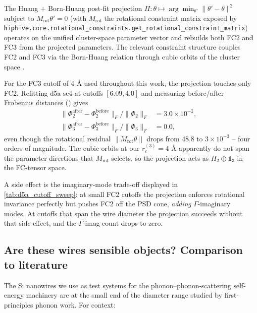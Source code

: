 The Huang + Born-Huang post-fit projection
$\Pi: \theta \mapsto \arg\min_{\theta'} \|\theta'-\theta\|^2$ subject
to $M_\mathrm{rot}\theta' = 0$ (with $M_\mathrm{rot}$ the rotational
constraint matrix exposed by
\texttt{hiphive.core.rotational\_constraints.\allowbreak get\_rotational\_constraint\_matrix})
operates on the unified cluster-space parameter vector and rebuilds
both FC2 and FC3 from the projected parameters.  The relevant
constraint structure couples FC2 and FC3 via the Born-Huang relation
through cubic orbits of the cluster space \cite{eriksson_hiphive_2019}.

For the FC3 cutoff of 4 Å used throughout this work, the projection
touches only FC2.  Refitting d5a sc4 at cutoffs $[6.09, 4.0]$ and
measuring before/after Frobenius distances
() gives
\begin{align*}
  \|\Phi_2^\mathrm{after} - \Phi_2^\mathrm{before}\|_F / \|\Phi_2\|_F &= 3.0 \times 10^{-2}, \\
  \|\Phi_3^\mathrm{after} - \Phi_3^\mathrm{before}\|_F / \|\Phi_3\|_F &= 0.0,
\end{align*}
even though the rotational residual $\|M_\mathrm{rot}\theta\|$ drops
from 48.8 to $3 \times 10^{-3}$ -- four orders of magnitude.  The
cubic orbits at our $r_c^{(3)} = 4$ Å apparently do not span the
parameter directions that $M_\mathrm{rot}$ selects, so the projection
acts as $\Pi_2 \oplus \mathbb{1}_3$ in the FC-tensor space.

A side effect is the imaginary-mode trade-off displayed in
\cref{tab:d5a_cutoff_sweep}: at small FC2 cutoffs the projection
enforces rotational invariance perfectly but pushes FC2 off the PSD
cone, \emph{adding} $\Gamma$-imaginary modes.  At cutoffs that span the wire
diameter the projection succeeds without that side-effect, and the
$\Gamma$-imag count drops to zero.

\subsection{Are these wires sensible objects?  Comparison to literature}
\label{sec:sinw_literature}

The Si nanowires we use as test systems for the
phonon--phonon-scattering self-energy machinery are at the small end
of the diameter range studied by first-principles phonon work.  For
context:

